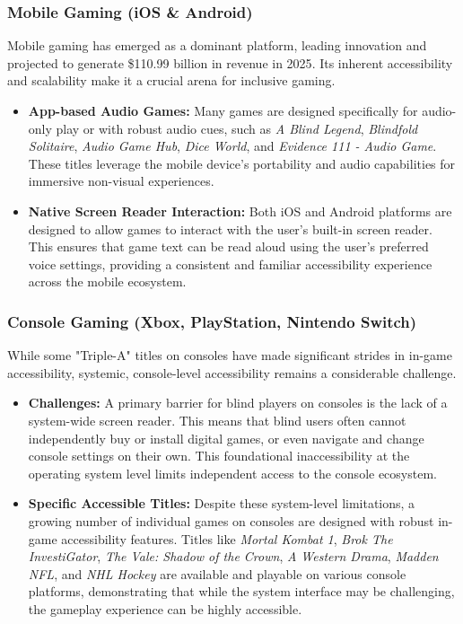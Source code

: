 \subsubsection{Mobile Gaming (iOS \& Android)}

Mobile gaming has emerged as a dominant platform, leading innovation and projected to generate \$110.99 billion in revenue in 2025\supercite{SlavnaStudio2025}. Its inherent accessibility and scalability make it a crucial arena for inclusive gaming.
\begin{itemize}
    \item \textbf{App-based Audio Games:} Many games are designed specifically for audio-only play or with robust audio cues, such as \textit{A Blind Legend}\supercite{AppleStoreBlindLegend}, \textit{Blindfold Solitaire}\supercite{AppleStoreSolitaire}, \textit{Audio Game Hub}, \textit{Dice World}, and \textit{Evidence 111 - Audio Game}\supercite{GoogleSearchAndroid}. These titles leverage the mobile device's portability and audio capabilities for immersive non-visual experiences.
    \item \textbf{Native Screen Reader Interaction:} Both iOS and Android platforms are designed to allow games to interact with the user's built-in screen reader. This ensures that game text can be read aloud using the user's preferred voice settings, providing a consistent and familiar accessibility experience across the mobile ecosystem\supercite{AFBIntroVG}.
\end{itemize}

\subsubsection{Console Gaming (Xbox, PlayStation, Nintendo Switch)}

While some "Triple-A" titles on consoles have made significant strides in in-game accessibility, systemic, console-level accessibility remains a considerable challenge.
\begin{itemize}
    \item \textbf{Challenges:} A primary barrier for blind players on consoles is the lack of a system-wide screen reader. This means that blind users often cannot independently buy or install digital games, or even navigate and change console settings on their own\supercite{LudaccessList}. This foundational inaccessibility at the operating system level limits independent access to the console ecosystem.
    \item \textbf{Specific Accessible Titles:} Despite these system-level limitations, a growing number of individual games on consoles are designed with robust in-game accessibility features. Titles like \textit{Mortal Kombat 1}, \textit{Brok The InvestiGator}, \textit{The Vale: Shadow of the Crown}, \textit{A Western Drama}, \textit{Madden NFL}, and \textit{NHL Hockey} are available and playable on various console platforms, demonstrating that while the system interface may be challenging, the gameplay experience can be highly accessible\supercite{LudaccessList}.
\end{itemize}

